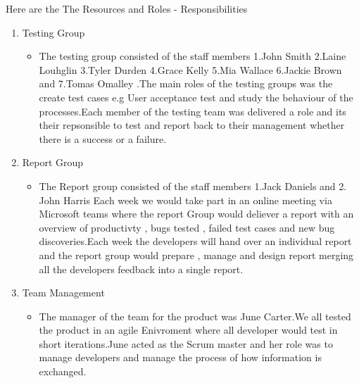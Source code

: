 
Here are the The Resources and Roles - Responsibilities

\begin{enumerate}
 
 
\item Testing Group
   \begin{itemize}
     \item The testing group consisted of the staff members 1.John Smith 2.Laine Louhglin
     3.Tyler Durden 4.Grace Kelly 5.Mia Wallace 6.Jackie Brown and 7.Tomas Omalley
     .The main roles of the testing groups was the create test cases e.g User acceptance test and study the behaviour of the processes.Each member of the testing team was delivered a role and its their repsonsible to test and report back to their management whether there is a success or a failure.
   \end{itemize}






\item Report Group
   \begin{itemize}
     \item The Report group consisted of  the staff members 1.Jack Daniels and 2. John  Harris Each week we would take part in an online meeting via Microsoft teams where the report Group would deliever a report with an overview of productivty , bugs tested , failed test cases and new bug discoveries.Each week the developers will hand over an individual report and  the report group would prepare , manage and design report merging all the developers feedback into a single report.
   \end{itemize}


\item Team Management
   \begin{itemize}
     \item The manager of the team for the product was June Carter.We all tested the product in an agile Enivroment where all developer would test in short iterations.June acted as the Scrum master and her role was to manage developers and manage the process of how information is exchanged.
   \end{itemize}


   
\end{enumerate}


  